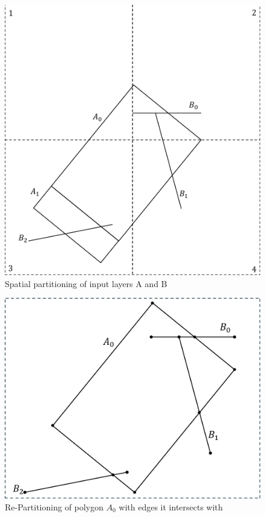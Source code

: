 \begin{figure}[tb]
	\centering
	\includegraphics[width=0.75 \linewidth ]{model/DangleOverlay1.pdf}
	\caption[caption]{Spatial partitioning of input layers A and B}
	\label{fig:dangleoverlay:input}
\end{figure}

\begin{figure}[tb]
	\centering
	\includegraphics[width=0.75 \linewidth ]{model/DangleOverlay2.pdf}
	\caption[caption]{Re-Partitioning of polygon $A_0$ with edges it intersects with}
	\label{fig:dangleoverlay:inter}
\end{figure}

